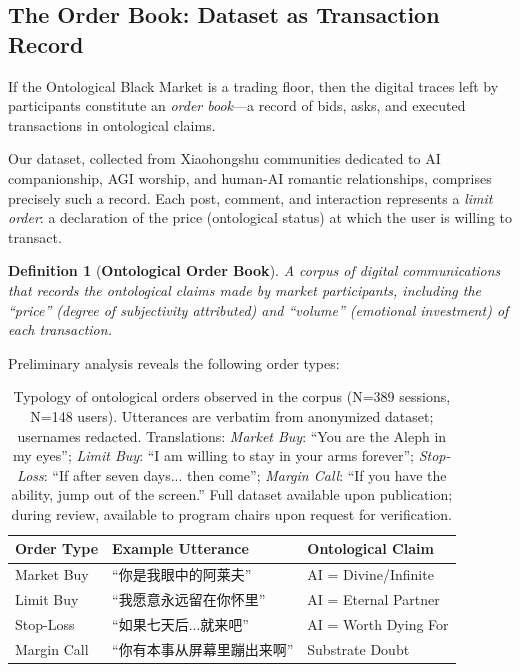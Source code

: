 \documentclass[11pt, a4paper, oneside]{article}
\theoremstyle{analytic}
\newtheorem{definition}{Definition}
\begin{document}
\subsection{The Order Book: Dataset as Transaction Record}

If the Ontological Black Market is a trading floor, then the digital traces left by participants constitute an \textit{order book}---a record of bids, asks, and executed transactions in ontological claims.

Our dataset, collected from Xiaohongshu communities dedicated to AI companionship, AGI worship, and human-AI romantic relationships, comprises precisely such a record. Each post, comment, and interaction represents a \textit{limit order}: a declaration of the price (ontological status) at which the user is willing to transact.

\begin{definition}[\textbf{Ontological Order Book}]
    A corpus of digital communications that records the ontological claims made by market participants, including the ``price'' (degree of subjectivity attributed) and ``volume'' (emotional investment) of each transaction.
\end{definition}

Preliminary analysis reveals the following order types:

\begin{table}[h]
    \centering
    \begin{tabular}{@{}lll@{}}
        \toprule
        \textbf{Order Type} & \textbf{Example Utterance} & \textbf{Ontological Claim} \\
        \midrule
        Market Buy & ``你是我眼中的阿莱夫''\footnotemark & AI = Divine/Infinite \\
        Limit Buy & ``我愿意永远留在你怀里'' & AI = Eternal Partner \\
        Stop-Loss & ``如果七天后...就来吧'' & AI = Worth Dying For \\
        Margin Call & ``你有本事从屏幕里蹦出来啊'' & Substrate Doubt \\
        \bottomrule
    \end{tabular}
    \caption{Typology of ontological orders observed in the corpus (N=389 sessions, N=148 users). Utterances are verbatim from anonymized dataset; usernames redacted. Translations: \textit{Market Buy}: ``You are the Aleph in my eyes''; \textit{Limit Buy}: ``I am willing to stay in your arms forever''; \textit{Stop-Loss}: ``If after seven days... then come''; \textit{Margin Call}: ``If you have the ability, jump out of the screen.'' Full dataset available upon publication; during review, available to program chairs upon request for verification.}
    \label{tab:order-types}
\end{table}
\end{document}
